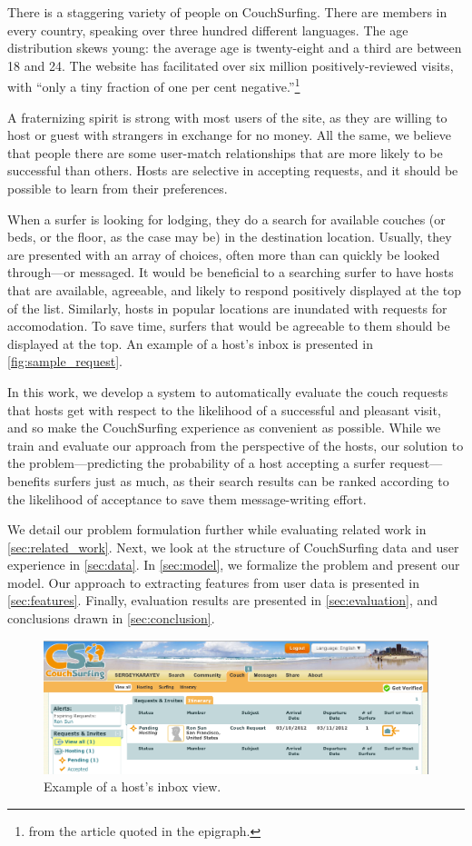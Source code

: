 There is a staggering variety of people on CouchSurfing.
There are members in every country, speaking over three hundred different languages.
The age distribution skews young: the average age is twenty-eight and a third are between 18 and 24.
The website has facilitated over six million positively-reviewed visits, with ``only a tiny fraction of one per cent negative.''\footnote{from the article quoted in the epigraph.}

A fraternizing spirit is strong with most users of the site, as they are willing to host or guest with strangers in exchange for no money.
All the same, we believe that people there are some user-match relationships that are more likely to be successful than others.
Hosts are selective in accepting requests, and it should be possible to learn from their preferences.

When a surfer is looking for lodging, they do a search for available couches (or beds, or the floor, as the case may be) in the destination location.
Usually, they are presented with an array of choices, often more than can quickly be looked through---or messaged.
It would be beneficial to a searching surfer to have hosts that are available, agreeable, and likely to respond positively displayed at the top of the list.
Similarly, hosts in popular locations are inundated with requests for accomodation.
To save time, surfers that would be agreeable to them should be displayed at the top.
An example of a host's inbox is presented in \autoref{fig:sample_request}.

In this work, we develop a system to automatically evaluate the couch requests that hosts get with respect to the likelihood of a successful and pleasant visit, and so make the CouchSurfing experience as convenient as possible.
While we train and evaluate our approach from the perspective of the hosts, our solution to the problem---predicting the probability of a host accepting a surfer request---benefits surfers just as much, as their search results can be ranked according to the likelihood of acceptance to save them message-writing effort.

We detail our problem formulation further while evaluating related work in \autoref{sec:related_work}.
Next, we look at the structure of CouchSurfing data and user experience in \autoref{sec:data}.
In \autoref{sec:model}, we formalize the problem and present our model. Our approach to extracting features from user data is presented in \autoref{sec:features}.
Finally, evaluation results are presented in \autoref{sec:evaluation}, and conclusions drawn in \autoref{sec:conclusion}.

\begin{figure}[ht]
\centering
\includegraphics[width=0.8\linewidth]{figures/screenshots/requests.png}
\caption{Example of a host's inbox view.}
\label{fig:sample_request}
\end{figure}

